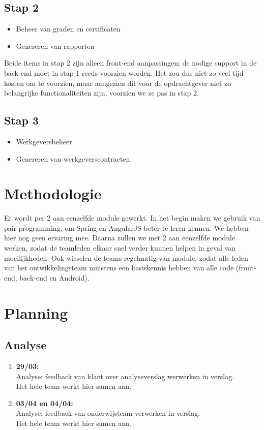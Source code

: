 \documentclass[a4paper]{article}
\begin{document}
\subsection{Stap 2}
\begin{itemize}
    \item Beheer van graden en certificaten
    \item Genereren van rapporten
\end{itemize}
Beide items in stap 2 zijn alleen front-end aanpassingen; de nodige support in de back-end moet in stap 1 reeds voorzien worden. Het zou dus niet zo veel tijd kosten om te voorzien, maar aangezien dit voor de opdrachtgever niet zo belangrijke functionaliteiten zijn, voorzien we ze pas in stap 2.

\subsection{Stap 3}
\begin{itemize}
    \item Werkgeversbeheer
    \item Genereren van werkgeverscontracten
\end{itemize}



\section{Methodologie}
Er wordt per 2 aan eenzelfde module gewerkt. In het begin maken we gebruik van pair programming, om Spring en AngularJS beter te leren kennen. We hebben hier nog geen ervaring mee. Daarna zullen we met 2 aan eenzelfde module werken, zodat de teamleden elkaar snel verder kunnen helpen in geval van moeilijkheden. Ook wisselen de teams regelmatig van module, zodat alle leden van het ontwikkelingsteam minstens een basiskennis hebben van alle code (front-end, back-end en Android).



\newpage
\section{Planning}
\subsection{Analyse}
\begin{enumerate}
    \item \textbf{29/03:}\\
    Analyse: feedback van klant over analyseverslag werwerken in verslag.\\
    Het hele team werkt hier samen aan.
    \item \textbf{03/04 en 04/04:}\\
    Analyse: feedback van onderwijsteam verwerken in verslag.\\
    Het hele team werkt hier samen aan.
\end{enumerate}
\end{document}
